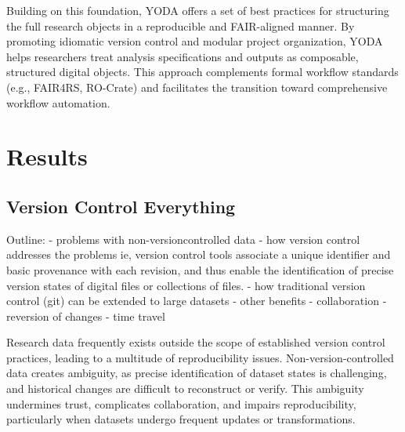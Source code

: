 \documentclass{article}
\begin{document}
Building on this foundation, YODA offers a set of best practices for structuring the full research objects in a reproducible and FAIR-aligned manner.
By promoting idiomatic version control and modular project organization, YODA helps researchers treat analysis specifications and outputs as composable, structured digital objects.
This approach complements formal workflow standards (e.g., FAIR4RS, RO-Crate) and facilitates the transition toward comprehensive workflow automation.



\section{Results}

\subsection{Version Control Everything}

Outline:
  - problems with non-versioncontrolled data
  - how version control addresses the problems
    ie, version control tools associate a unique identifier and basic provenance with each revision, and thus enable the identification of precise version states of digital files or collections of files.
  - how traditional version control (git) can be extended to large datasets
  - other benefits
    - collaboration
    - reversion of changes
    - time travel

Research data frequently exists outside the scope of established version control practices, leading to a multitude of reproducibility issues.
Non-version-controlled data creates ambiguity, as precise identification of dataset states is challenging, and historical changes are difficult to reconstruct or verify.
This ambiguity undermines trust, complicates collaboration, and impairs reproducibility, particularly when datasets undergo frequent updates or transformations.
\end{document}

